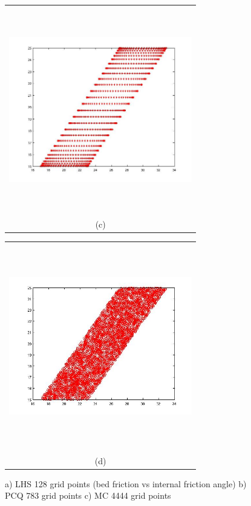 \documentclass{article}
\newcommand{\Pic}[2][0.85]{\begin{center}\texttt{[image: \#2]}
 \end{center} }
\begin{document}
\begin{figure}[H]
\begin{minipage}[b]{0.6\textwidth}
    \end{minipage}
    \begin{minipage}{0.6\textwidth}
        \begin{tabular}{c}
	\includegraphics[width=8cm,height=9cm,keepaspectratio]{fig/PCQ_783.jpg}\\
        (c)
        \end{tabular}
    \end{minipage}
   \begin{minipage}[c]{0.6\textwidth}
       \begin{tabular}{c}
       \includegraphics[width=8cm,height=9cm,keepaspectratio]{fig/mc_4444.jpg}\\
        (d)
        \end{tabular}
    \end{minipage}
\caption{a) LHS 128 grid points (bed friction vs internal friction angle)
b) PCQ 783 grid points c) MC 4444 grid points }
\label{fig3}  
\end{figure}
\end{document}
